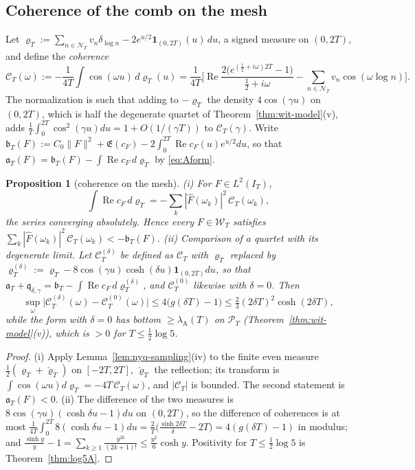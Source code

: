 \documentclass[11pt]{amsart}
\newtheorem{proposition}[theorem]{Proposition}
\theoremstyle{definition}
\theoremstyle{remark}
\newcommand{\Rel}{\operatorname{Re}}
\newcommand{\PT}{\mathcal P_T}
\newcommand{\IT}{I_T}
\newcommand{\lamA}{\lambda_{\mathrm A}(T)}
\newcommand{\Fh}{\widehat F}
\newcommand{\cF}{c_F}
\newcommand{\Lev}{\mathfrak E}
\newcommand{\NT}{\mathcal N_T}
\begin{document}
\subsection{Coherence of the comb on the mesh}
Let $\varrho_T:=\sum_{n\in\NT}v_n\delta_{\log n}-2e^{u/2}\mathbf 1_{(0,2T)}(u)\,du$, a signed measure on $(0,2T)$, and define the
\emph{coherence}
\[
\mathcal C_T(\omega):=-\frac1{4T}\int\cos(\omega u)\,d\varrho_T(u)
=\frac1{4T}\Big[\Rel\frac{2\big(e^{(\frac12+i\omega)2T}-1\big)}{\frac12+i\omega}-\sum_{n\in\NT}v_n\cos(\omega\log n)\Big].
\]
The normalization is such that adding to $-\varrho_T$ the density $4\cos(\gamma u)$ on $(0,2T)$, which is half the
degenerate quartet of Theorem~\ref{thm:wit-model}(v), adds $\frac1T\int_0^{2T}\cos^2(\gamma u)du=1+O(1/(\gamma T))$ to
$\mathcal C_T(\gamma)$. Write $\mathfrak b_T(F):=C_0\|F\|^2+\Lev(\cF)-2\int_0^{2T}\Rel\cF(u)e^{u/2}du$, so that
$\mathfrak a_T(F)=\mathfrak b_T(F)-\int\Rel\cF\,d\varrho_T$ by \eqref{eq:Aform}.

\begin{proposition}[coherence on the mesh]\label{prop:wit-coh}
\emph{(i)} For $F\in L^2(\IT)$,
\[
\int\Rel\cF\,d\varrho_T=-\sum_k|\Fh(\omega_k)|^2\,\mathcal C_T(\omega_k),
\]
the series converging absolutely. Hence every $F\in\mathscr W_T$ satisfies $\sum_k|\Fh(\omega_k)|^2\,\mathcal C_T(\omega_k)<-\mathfrak b_T(F)$.
\emph{(ii) Comparison of a quartet with its degenerate limit.} Let $\mathcal C^{(\delta)}_T$ be defined as $\mathcal C_T$ with
$\varrho_T$ replaced by $\varrho^{(\delta)}_T:=\varrho_T-8\cos(\gamma u)\cosh(\delta u)\mathbf 1_{(0,2T)}du$, so that
$\mathfrak a_T+\mathfrak q_{\delta,\gamma}=\mathfrak b_T-\int\Rel\cF\,d\varrho^{(\delta)}_T$, and $\mathcal C^{(0)}_T$ likewise with $\delta=0$. Then
\[
\sup_\omega\big|\mathcal C^{(\delta)}_T(\omega)-\mathcal C^{(0)}_T(\omega)\big|\le4\big(g(\delta T)-1\big)\le\tfrac23(2\delta T)^2\cosh(2\delta T),
\]
while the form with $\delta=0$ has bottom $\ge\lamA$ on $\PT$ (Theorem~\ref{thm:wit-model}(v)), which is $>0$ for
$T\le\frac12\log5$.
\end{proposition}

\begin{proof}
(i) Apply Lemma~\ref{lem:nyq-sampling}(iv) to the finite even measure $\frac12(\varrho_T+\check\varrho_T)$ on
$[-2T,2T]$, $\check\varrho_T$ the reflection; its transform is $\int\cos(\omega u)d\varrho_T=-4T\,\mathcal C_T(\omega)$, and
$|\mathcal C_T|$ is bounded. The second statement is $\mathfrak a_T(F)<0$. (ii) The difference of the two measures is
$8\cos(\gamma u)(\cosh\delta u-1)du$ on $(0,2T)$, so the difference of coherences is at most
$\frac1{4T}\int_0^{2T}8(\cosh\delta u-1)du=\frac2T\big(\frac{\sinh2\delta T}\delta-2T\big)=4(g(\delta T)-1)$ in modulus; and
$\frac{\sinh y}y-1=\sum_{k\ge1}\frac{y^{2k}}{(2k+1)!}\le\frac{y^2}6\cosh y$. Positivity for $T\le\frac12\log5$ is
Theorem~\ref{thm:log5A}.
\end{proof}
\end{document}
